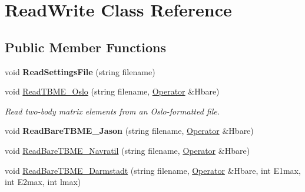 \hypertarget{classReadWrite}{\section{Read\-Write Class Reference}
\label{classReadWrite}
}
\subsection*{Public Member Functions}
\begin{DoxyCompactItemize}
\item 
\hypertarget{classReadWrite_a7074f8c5e6b1bbeb90a4c534b913ac53}{void {\bfseries Read\-Settings\-File} (string filename)}\label{classReadWrite_a7074f8c5e6b1bbeb90a4c534b913ac53}

\item 
\hypertarget{classReadWrite_aa8d42bb8082881c30331a44f01118381}{void \hyperlink{classReadWrite_aa8d42bb8082881c30331a44f01118381}{Read\-T\-B\-M\-E\-\_\-\-Oslo} (string filename, \hyperlink{classOperator}{Operator} \&Hbare)}\label{classReadWrite_aa8d42bb8082881c30331a44f01118381}

\begin{DoxyCompactList}\small\item\em Read two-\/body matrix elements from an Oslo-\/formatted file. \end{DoxyCompactList}\item 
\hypertarget{classReadWrite_ae5271000cceab5fcebab7e9d2faf9f1f}{void {\bfseries Read\-Bare\-T\-B\-M\-E\-\_\-\-Jason} (string filename, \hyperlink{classOperator}{Operator} \&Hbare)}\label{classReadWrite_ae5271000cceab5fcebab7e9d2faf9f1f}

\item 
void \hyperlink{classReadWrite_ab66f5d7e2e352e973597915c08cad45d}{Read\-Bare\-T\-B\-M\-E\-\_\-\-Navratil} (string filename, \hyperlink{classOperator}{Operator} \&Hbare)
\item 
\hypertarget{classReadWrite_a7d1ea6782d893eab0217bb965fba990e}{void \hyperlink{classReadWrite_a7d1ea6782d893eab0217bb965fba990e}{Read\-Bare\-T\-B\-M\-E\-\_\-\-Darmstadt} (string filename, \hyperlink{classOperator}{Operator} \&Hbare, int E1max, int E2max, int lmax)}\label{classReadWrite_a7d1ea6782d893eab0217bb965fba990e}


\end{DoxyCompactItemize}
